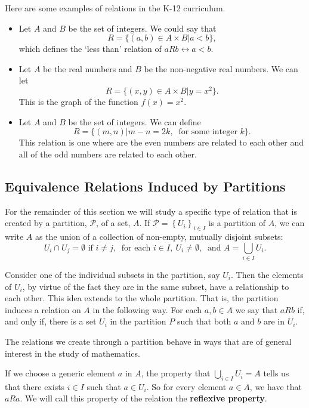 \documentclass[
]{book}
\theoremstyle{definition}
\theoremstyle{definition}
\theoremstyle{definition}
\theoremstyle{remark}
\begin{document}
Here are some examples of relations in the K-12 curriculum.

\begin{itemize}
\item
  Let \(A\) and \(B\) be the set of integers. We could say that \[R=\{(a,b)\in A\times B \vert a<b\},\] which defines the `less than' relation of \(aRb \leftrightarrow a<b\).
\item
  Let \(A\) be the real numbers and \(B\) be the non-negative real numbers. We can let \[R=\{(x,y)\in A\times B \vert y=x^2\}.\] This is the graph of the function \(f(x)=x^2\).
\item
  Let \(A\) and \(B\) be the set of integers. We can define \[R= \{(m,n) \vert m-n=2k, \: \mbox{ for some integer } k\}.\] This relation is one where are the even numbers are related to each other and all of the odd numbers are related to each other.
\end{itemize}

\hypertarget{equivalence-relations-induced-by-partitions}{%
\subsection{Equivalence Relations Induced by Partitions}\label{equivalence-relations-induced-by-partitions}}

For the remainder of this section we will study a specific type of relation that is created by a partition, \(\mathcal{P}\), of a set, \(A\). If \(\mathcal{P}=\left\{U_i\right\}_{i\in I}\) is a partition of \(A\), we can write \(A\) as the union of a collection of non-empty, mutually disjoint subsets: \[U_i \cap U_j = \emptyset \mbox{ if } i\neq j, \: \mbox{ for each } i \in I, \: U_i\neq \emptyset, \: \mbox{ and } A=\bigcup_{i\in I} U_i.\]

Consider one of the individual subsets in the partition, say \(U_i\). Then the elements of \(U_i\), by virtue of the fact they are in the same subset, have a relationship to each other. This idea extends to the whole partition. That is, the partition induces a relation on \(A\) in the following way. For each \(a,b\in A\) we say that \(aRb\) if, and only if, there is a set \(U_i\) in the partition \(P\) such that both \(a\) and \(b\) are in \(U_i\).

The relations we create through a partition behave in ways that are of general interest in the study of mathematics.

If we choose a generic element \(a\) in \(A\), the property that \(\bigcup_{i\in I} U_i = A\) tells us that there exists \(i\in I\) such that \(a \in U_i\). So for every element \(a\in A\), we have that \(aRa\). We will call this property of the relation the \textbf{reflexive property}.
\end{document}
